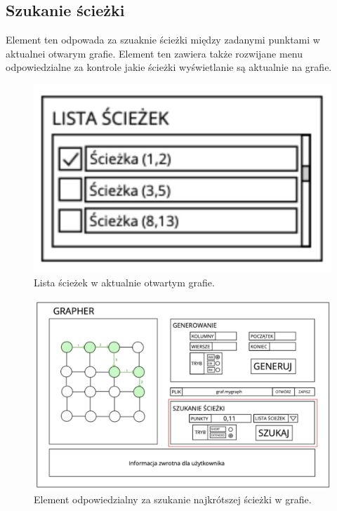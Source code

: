 \documentclass[10pt, a4paper]{report}
\begin{document}
    \subsection{Szukanie ścieżki}
    Element ten odpowada za szuaknie ścieżki między zadanymi punktami w aktualnei otwarym grafie. Element ten zawiera także rozwijane menu odpowiedzialne za kontrole jakie ścieżki wyświetlanie są aktualnie na grafie.
    \begin{figure}[ht]
      \begin{center}
          \includegraphics[scale=0.4]{gui_path_list.jpg}
          \caption{Lista ścieżek w aktualnie otwartym grafie.}
      \end{center}
    \end{figure}    
    \begin{figure}[ht]
      \begin{center}
          \includegraphics[scale=0.19]{gui_read.jpg}
          \caption{Element odpowiedzialny za szukanie najkrótszej ścieżki w grafie.}
      \end{center}
    \end{figure}
    \newpage
    
\end{document}
